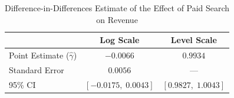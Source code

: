 \begin{table}[h]
\centering
\caption{Difference-in-Differences Estimate of the Effect of Paid Search on Revenue}
\begin{tabular}{lcc}
\hline
 & Log Scale & Level Scale \\
\hline
Point Estimate ($\hat{\gamma}$) & $-0.0066$ & $0.9934$ \\
Standard Error & $0.0056$ & --- \\
95\% CI & $[-0.0175, \; 0.0043]$ & $[0.9827, \; 1.0043]$ \\
\hline
\end{tabular}
\label{tab:did}
\end{table}
